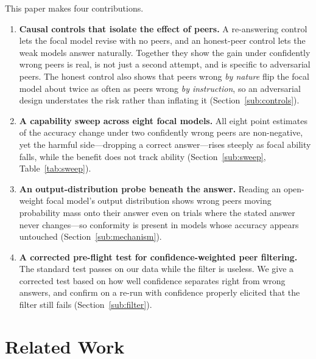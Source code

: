 \documentclass[11pt]{article}
\begin{document}
This paper makes four contributions.
\begin{enumerate}\itemsep1pt
    \item \textbf{Causal controls that isolate the effect of peers.}
          A re-answering control lets the focal model revise with no peers,
          and an honest-peer control lets the weak models answer naturally.
          Together they show the gain under confidently wrong peers is real,
          is not just a second attempt, and is specific to adversarial peers.
          The honest control also shows that peers wrong \emph{by nature} flip
          the focal model about twice as often as peers wrong \emph{by
          instruction}, so an adversarial design understates the risk rather
          than inflating it (Section~\ref{sub:controls}).
    \item \textbf{A capability sweep across eight focal models.}
          All eight point estimates of the accuracy change under two
          confidently wrong peers are non-negative, yet the harmful
          side---dropping a correct answer---rises steeply as focal ability
          falls, while the benefit does not track ability
          (Section~\ref{sub:sweep}, Table~\ref{tab:sweep}).
    \item \textbf{An output-distribution probe beneath the answer.}
          Reading an open-weight focal model's output distribution shows wrong
          peers moving probability mass onto their answer even on trials where
          the stated answer never changes---so conformity is present in models
          whose accuracy appears untouched (Section~\ref{sub:mechanism}).
    \item \textbf{A corrected pre-flight test for confidence-weighted peer
          filtering.} The standard test passes on our data while the filter
          is useless.
          We give a corrected test based on how well confidence separates
          right from wrong answers, and confirm on a re-run with confidence
          properly elicited that the filter still fails
          (Section~\ref{sub:filter}).
\end{enumerate}

\section{Related Work}
\label{sec:related}
\end{document}

